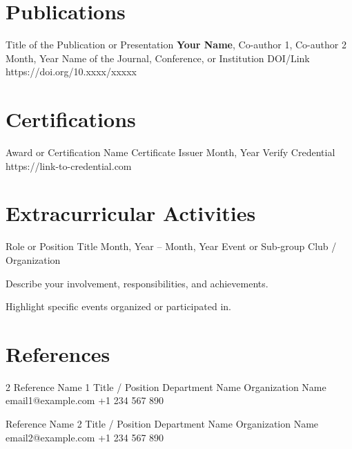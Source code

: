 \documentclass[11pt, a4paper]{article}
\begin{document}
\section{Publications}
\cvPublication
    {Title of the Publication or Presentation}
    {\textbf{Your Name}, Co-author 1, Co-author 2}
    {Month, Year}
    {Name of the Journal, Conference, or Institution}
    {DOI/Link}
    {https://doi.org/10.xxxx/xxxxx}


\section{Certifications}
\cvCert
    {Award or Certification Name}
    {Certificate Issuer}
    {Month, Year}
    {Verify Credential}
    {https://link-to-credential.com}


\section{Extracurricular Activities}
\cvExtracurricularActivity
    {Role or Position Title}
    {Month, Year – Month, Year}
    {Event or Sub-group}
    {Club / Organization}
    {
        \item Describe your involvement, responsibilities, and achievements.
        \item Highlight specific events organized or participated in.
    }


\section{References}
\begin{paracol}{2}
\cvReference
    {Reference Name 1}
    {Title / Position}
    {Department Name}
    {Organization Name}
    {email1@example.com}
    {+1 234 567 890}

\switchcolumn

\cvReference
    {Reference Name 2}
    {Title / Position}
    {Department Name}
    {Organization Name}
    {email2@example.com}
    {+1 234 567 890}
\end{paracol}
\end{document}
